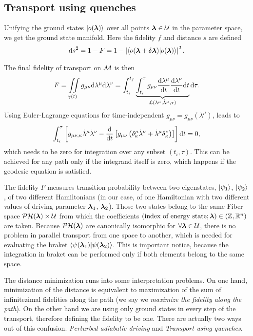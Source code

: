 \subsection{Transport using quenches}
\label{sec:quenches}
Unifying the ground states $\ket{o({\bm\lambda})}$ over all points ${\bm\lambda}\in\mathcal U$ in the parameter space, we get the ground state manifold. Here the fidelity $f$ and distance $s$ are defined
\begin{equation}
    \mathrm{d} s^2 = 1-F = 1-\left|\braket{o(\bm{{\bm\lambda}}+\delta\bm{{\bm\lambda}})|o(\bm{{\bm\lambda}})}\right|^2.
    \label{eq:distanceOnM0_1}
\end{equation}

The final fidelity of transport on $\mathcal{M}$ is then
\begin{equation}
    F=\iint\limits_{\gamma(t)} g_{\mu\nu}\mathrm{d}\lambda^\mu\mathrm{d}\lambda^\nu = \int_{t_i}^{t_f}\underbrace{\int_{t_i}^\tau g_{\mu\nu}\frac{\mathrm{d} \lambda^\mu}{\mathrm{d} t}\frac{\mathrm{d} \lambda^\nu}{\mathrm{d} t} \mathrm{d} t}_{\mathcal{L}(\lambda^\mu,\dot\lambda^\mu,\tau)}\mathrm{d} \tau .
\end{equation}
Using Euler-Lagrange equations for time-independent $g_{\mu\nu}=g_{\mu\nu}(\lambda^\mu)$, leads to
\begin{equation}
    \int_{t_i}^{\tau}\left[g_{\mu\nu,\kappa}\dot\lambda^\mu\dot\lambda^\nu - \frac{\mathrm{d} }{\mathrm{d} t}\left[g_{\mu\nu}\left(\delta^\mu_\kappa\dot\lambda^\nu+\dot\lambda^\mu\delta^\nu_\kappa\right)\right]\right]\mathrm{d} t=0,
\end{equation}
which needs to be zero for integration over any subset $(t_i,\tau)$. This can be achieved for any path only if the integrand itself is zero, which happens if the geodesic equation is satisfied.

The fidelity $F$ measures transition probability between two eigenstates, $\ket{\psi_1}$, $\ket{\psi_2}$, of two different Hamiltonians (in our case, of one Hamiltonian with two different values of driving parameter ${\bm\lambda}_1$, ${\bm\lambda}_2$). Those two states belong to the same Fiber space $\mathcal{PH}({\bm\lambda})\times \mathcal U$ from which the coefficients $(\text{index of energy state}; {\bm\lambda})\in (\mathbb{Z},\mathbb{R}^n)$ are taken. Because $\mathcal{PH}({\bm\lambda})$ are canonically isomorphic for $\forall {\bm\lambda}\in \mathcal U$, there is no problem in parallel transport from one space to another, which is needed for evaluating the braket $\braket{\psi({\bm\lambda}_1)|\psi({\bm\lambda}_2)}$. This is important notice, because the integration in braket can be performed only if both elements belong to the same space.

The distance minimization runs into some interpretation problems. On one hand, minimization of the distance is equivalent to maximization of the sum of infinitezimal fidelities along the path (we say we \emph{maximize the fidelity along the path}). On the other hand we are using only ground states in every step of the transport, therefore defining the fidelity to be one. There are actually two ways out of this confusion. \emph{Perturbed adiabatic driving} and \emph{Transport using quenches}.


